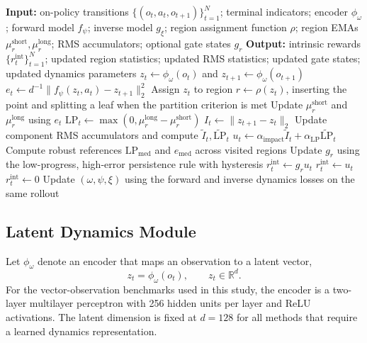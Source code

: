 \begin{algorithm}[!htbp]
\caption[GLPE intrinsic-reward computation]{High-level intrinsic-reward computation for the GLPE family within one PPO update.}
\label{alg:methodology_glpe_reward}
\small
\begin{algorithmic}[1]
\STATE \textbf{Input:} on-policy transitions $\{(o_t,a_t,o_{t+1})\}_{t=1}^{N}$; terminal indicators; encoder $\phi_\omega$; forward model $f_\psi$; inverse model $g_\xi$; region assignment function $\rho$; region EMAs $\mu_r^{\mathrm{short}},\mu_r^{\mathrm{long}}$; RMS accumulators; optional gate states $g_r$
\STATE \textbf{Output:} intrinsic rewards $\{r_t^{\mathrm{int}}\}_{t=1}^{N}$; updated region statistics; updated RMS statistics; updated gate states; updated dynamics parameters
    \STATE $z_t \gets \phi_\omega(o_t)$ and $z_{t+1} \gets \phi_\omega(o_{t+1})$
    \STATE $e_t \gets d^{-1}\lVert f_\psi(z_t,a_t)-z_{t+1}\rVert_2^2$
    \STATE Assign $z_t$ to region $r \gets \rho(z_t)$, inserting the point and splitting a leaf when the partition criterion is met
    \STATE Update $\mu_r^{\mathrm{short}}$ and $\mu_r^{\mathrm{long}}$ using $e_t$
    \STATE $\mathrm{LP}_t \gets \max(0,\mu_r^{\mathrm{long}}-\mu_r^{\mathrm{short}})$
    \STATE $I_t \gets \lVert z_{t+1}-z_t\rVert_2$
    \STATE Update component RMS accumulators and compute $\widetilde{I}_t,\widetilde{\mathrm{LP}}_t$
    \STATE $u_t \gets \alpha_{\mathrm{impact}}\widetilde{I}_t+\alpha_{\mathrm{LP}}\widetilde{\mathrm{LP}}_t$
        \STATE Compute robust references $\mathrm{LP}_{\mathrm{med}}$ and $e_{\mathrm{med}}$ across visited regions
        \STATE Update $g_r$ using the low-progress, high-error persistence rule with hysteresis
        \STATE $r_t^{\mathrm{int}} \gets g_r u_t$
    \ELSE
        \STATE $r_t^{\mathrm{int}} \gets u_t$
    \ENDIF
        \STATE $r_t^{\mathrm{int}} \gets 0$
    \ENDIF
\ENDFOR
\STATE Update $(\omega,\psi,\xi)$ using the forward and inverse dynamics losses on the same rollout
\end{algorithmic}
\end{algorithm}

\subsection{Latent Dynamics Module}
\label{subsec:methodology_latent_dynamics_module}

Let $\phi_\omega$ denote an encoder that maps an observation to a latent vector,
\begin{equation}
    z_t = \phi_\omega(o_t), \qquad z_t \in \mathbb{R}^{d}.
\end{equation}
For the vector-observation benchmarks used in this study, the encoder is a two-layer multilayer perceptron with 256 hidden units per layer and ReLU activations.
The latent dimension is fixed at $d=128$ for all methods that require a learned dynamics representation.

